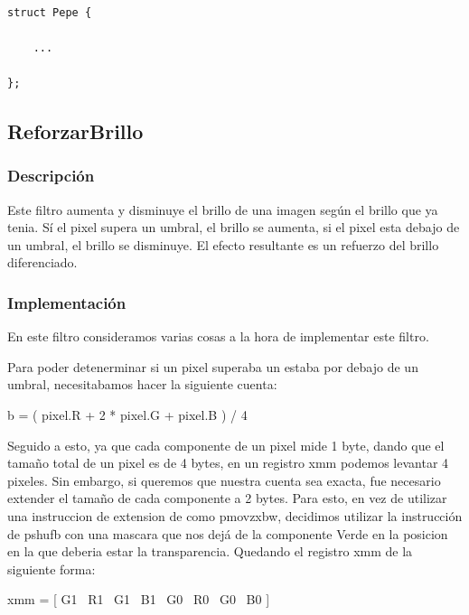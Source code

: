 \documentclass[a4paper]{article}
\newenvironment{codesnippet}{%
	\begin{Sbox}\begin{minipage}{\textwidth}\sffamily\small}%
	{\end{minipage}\end{Sbox}%
		\begin{center}%
		\vspace{-0.4cm}\colorbox{litegrey}{\TheSbox}\end{center}\vspace{0.3cm}}
\begin{document}
\begin{codesnippet}
\begin{verbatim}

struct Pepe {

    ...

};

\end{verbatim}
\end{codesnippet}

\subsection{ReforzarBrillo}

\subsubsection{Descripción}

Este filtro aumenta y disminuye el brillo de una imagen según el brillo que ya tenia. Sí el
pixel supera un umbral, el brillo se aumenta, si el pixel esta debajo de un umbral, el brillo se
disminuye. El efecto resultante es un refuerzo del brillo diferenciado.

\subsubsection{Implementaci\'on}

En este filtro consideramos varias cosas a la hora de implementar este filtro.

Para poder detenerminar si un pixel superaba un estaba por debajo de un umbral, necesitabamos hacer la siguiente cuenta:

\begin{center}
	b = ( pixel.R + 2 * pixel.G + pixel.B ) / 4
\end{center}

Seguido a esto, ya que cada componente de un pixel mide 1 byte, dando que el tama\~no total de un pixel es de 4 bytes, en un registro xmm podemos levantar 4 pixeles. Sin embargo, si queremos que nuestra cuenta sea exacta, fue necesario extender el tama\~no de cada componente a 2 bytes. Para esto, en vez de utilizar una instruccion de extension de como pmovzxbw, decidimos utilizar la instrucción de pshufb con una mascara que nos dejá de la componente Verde en la posicion en la que deberia estar la transparencia. Quedando el registro xmm de la siguiente forma: 

\begin{center}
	xmm = [ G1 \textpipe\ R1 \textpipe\ G1 \textpipe\ B1 \textpipe\ G0 \textpipe\ R0 \textpipe\ G0 \textpipe\ B0 ]
\end{center}
\end{document}
